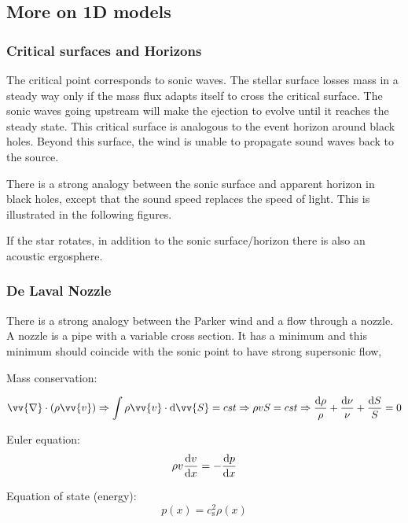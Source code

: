 \documentclass[10pt,a4paper,english]{article}
\begin{document}
\subsection{More on 1D models}

\subsubsection{Critical surfaces and Horizons}

The critical point corresponds to sonic waves. The stellar surface losses mass
in a steady way only if the mass flux adapts itself to cross the critical
surface. The sonic waves going upstream will make the ejection to evolve until
it reaches the steady state. This critical surface is analogous to the event
horizon around black holes. Beyond this surface, the wind is unable to
propagate sound waves back to the source.

There is a strong analogy between the sonic surface and apparent horizon in
black holes, except that the sound speed replaces the speed of light. This is
illustrated in the following figures.


If the star rotates, in addition to the sonic surface/horizon there is also an
acoustic ergosphere.

\subsubsection{De Laval Nozzle}

There is a strong analogy between the Parker wind and a flow through a nozzle.
A nozzle is a pipe with a variable cross section. It has a minimum and this
minimum should coincide with the sonic point to have strong supersonic flow,


Mass conservation:

\begin{equation}
    \vv{\nabla}\cdot(\rho\vv{v}) \Rightarrow \int \rho\vv{v}\cdot \d \vv{S} = cst \Rightarrow \rho vS = cst
    \Rightarrow \frac{\d \rho}{\rho} + \frac{\d \nu}{\nu} + \frac{\d S}{S} = 0
\end{equation}

Euler equation:
\begin{equation}
    \rho v \frac{\mathrm{d} v}{\mathrm{d} x} = -\frac{\mathrm{d} p}{\mathrm{d} x}
\end{equation}

Equation of state (energy):
\begin{equation}
    p(x) = c_\mathrm{s}^2\rho(x)
\end{equation}
\end{document}
